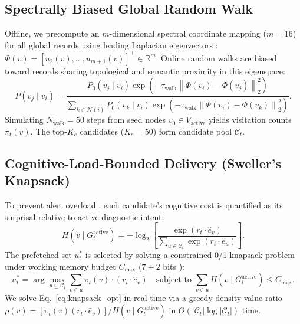 \documentclass[10pt, onecolumn]{article}
\newcommand{\R}{\mathbb{R}}
\newcommand{\norm}[1]{\left\lVert#1\right\rVert}
\begin{document}
\subsection{Spectrally Biased Global Random Walk}
Offline, we precompute an $m$-dimensional spectral coordinate mapping ($m=16$) for all global records using leading Laplacian eigenvectors \cite{belkin2003laplacian}: $\Phi(v) = [u_2(v), \dots, u_{m+1}(v)]^\top \in \R^m$. Online random walks are biased toward records sharing topological and semantic proximity in this eigenspace:
\begin{equation}
  P(v_j \mid v_i) = \frac{P_0(v_j \mid v_i) \exp\!\left( -\tau_{\text{walk}} \norm{\Phi(v_i) - \Phi(v_j)}_2^2 \right)}{\sum_{k \in \mathcal{N}(i)} P_0(v_k \mid v_i) \exp\!\left( -\tau_{\text{walk}} \norm{\Phi(v_i) - \Phi(v_k)}_2^2 \right)}.
  \label{eq:biased_transition}
\end{equation}
Simulating $N_{\text{walk}} = 50$ steps from seed nodes $v_0 \in V_{\text{active}}$ yields visitation counts $\pi_t(v)$. The top-$K_c$ candidates ($K_c = 50$) form candidate pool $\mathcal{C}_t$.

\subsection{Cognitive-Load-Bounded Delivery (Sweller's Knapsack)}
To prevent alert overload \cite{goddard2012automation}, each candidate's cognitive cost is quantified as its surprisal relative to active diagnostic intent:
\begin{equation}
  H(v \mid G_t^{\text{active}}) = -\log_2 \left[ \frac{\exp(r_t \cdot \hat{e}_v)}{\sum_{u \in \mathcal{C}_t} \exp(r_t \cdot \hat{e}_u)} \right].
  \label{eq:surprisal_cost}
\end{equation}
The prefetched set $u_t^*$ is selected by solving a constrained 0/1 knapsack problem under working memory budget $C_{\max}$ ($7 \pm 2$ bits \cite{miller1956magical}):
\begin{equation}
  u_t^* = \arg\max_{u \subseteq \mathcal{C}_t} \sum_{v \in u} \pi_t(v) \cdot (r_t \cdot \hat{e}_v) \quad \text{subject to } \sum_{v \in u} H(v \mid G_t^{\text{active}}) \le C_{\max}.
  \label{eq:knapsack_opt}
\end{equation}
We solve Eq.~\eqref{eq:knapsack_opt} in real time via a greedy density-value ratio $\rho(v) = [\pi_t(v) (r_t \cdot \hat{e}_v)] / H(v \mid G_t^{\text{active}})$ in $O(|\mathcal{C}_t| \log |\mathcal{C}_t|)$ time.
\end{document}
